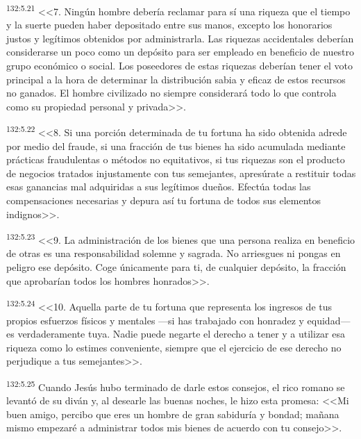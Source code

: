 \par 
\textsuperscript{132:5.21} <<7. Ningún hombre debería reclamar para sí una riqueza que el tiempo y la suerte pueden haber depositado entre sus manos, excepto los honorarios justos y legítimos obtenidos por administrarla. Las riquezas accidentales deberían considerarse un poco como un depósito para ser empleado en beneficio de nuestro grupo económico o social. Los poseedores de estas riquezas deberían tener el voto principal a la hora de determinar la distribución sabia y eficaz de estos recursos no ganados. El hombre civilizado no siempre considerará todo lo que controla como su propiedad personal y privada>>.

\par 
\textsuperscript{132:5.22} <<8. Si una porción determinada de tu fortuna ha sido obtenida adrede por medio del fraude, si una fracción de tus bienes ha sido acumulada mediante prácticas fraudulentas o métodos no equitativos, si tus riquezas son el producto de negocios tratados injustamente con tus semejantes, apresúrate a restituir todas esas ganancias mal adquiridas a sus legítimos dueños. Efectúa todas las compensaciones necesarias y depura así tu fortuna de todos sus elementos indignos>>.

\par 
\textsuperscript{132:5.23} <<9. La administración de los bienes que una persona realiza en beneficio de otras es una responsabilidad solemne y sagrada. No arriesgues ni pongas en peligro ese depósito. Coge únicamente para ti, de cualquier depósito, la fracción que aprobarían todos los hombres honrados>>.

\par 
\textsuperscript{132:5.24} <<10. Aquella parte de tu fortuna que representa los ingresos de tus propios esfuerzos físicos y mentales ---si has trabajado con honradez y equidad--- es verdaderamente tuya. Nadie puede negarte el derecho a tener y a utilizar esa riqueza como lo estimes conveniente, siempre que el ejercicio de ese derecho no perjudique a tus semejantes>>.

\par 
\textsuperscript{132:5.25} Cuando Jesús hubo terminado de darle estos consejos, el rico romano se levantó de su diván y, al desearle las buenas noches, le hizo esta promesa: <<Mi buen amigo, percibo que eres un hombre de gran sabiduría y bondad; mañana mismo empezaré a administrar todos mis bienes de acuerdo con tu consejo>>.

